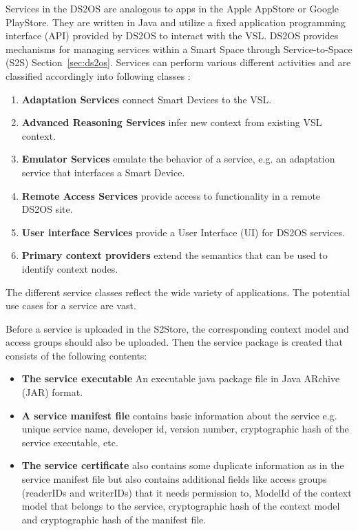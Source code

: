 Services in the DS2OS are analogous to apps in the Apple AppStore or Google PlayStore. They are written in Java and utilize a fixed application programming interface (API) provided by DS2OS to interact with the VSL. DS2OS provides mechanisms for managing services within a Smart Space through Service-to-Space (S2S) Section~\ref{sec:ds2os}. Services can perform various different activities and are classified accordingly into following classes \cite{pahl2014distributed}:

\begin{enumerate}
  \item \textbf{Adaptation Services} connect Smart Devices to the VSL.
  \item \textbf{Advanced Reasoning Services} infer new context from existing VSL context.
  \item \textbf{Emulator Services} emulate the behavior of a service, e.g. an adaptation service that interfaces a Smart Device.
  \item \textbf{Remote Access Services} provide access to functionality in a remote DS2OS site.
  \item \textbf{User interface Services} provide a User Interface (UI) for DS2OS services.
  \item \textbf{Primary context providers} extend the semantics that can be used to identify context nodes.
\end{enumerate}

The different service classes reflect the wide variety of applications. The potential use cases for a service are vast.

Before a service is uploaded in the S2Store, the corresponding context model and access groups should also be uploaded. Then the service package is created that consists of the following contents:

\begin{itemize}
  \item \textbf{The service executable} An executable java package file in Java ARchive (JAR) format.
  \item \textbf{A service manifest file} contains basic information about the service e.g. unique service name, developer id, version number, cryptographic hash of the service executable, etc.
  \item \textbf{The service certificate} also contains some duplicate information as in the service manifest file but also contains additional fields like access groups (readerIDs and writerIDs) that it needs permission to, ModelId of the context model that belongs to the service, cryptographic hash of the context model and cryptographic hash of the manifest file.
\end{itemize}


